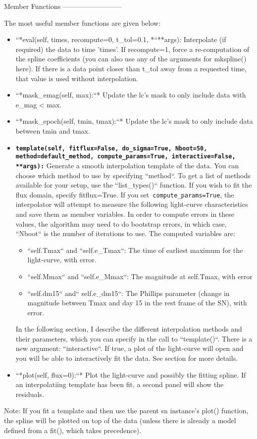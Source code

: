 Member Functions\label{sub:LCMember-Functions}
--------------------------

The most useful member functions are given below:
\begin{itemize}
\item ``*eval(self, times, recompute=0, t_tol=0.1, {*``{**args):}}
Interpolate (if required) the data to time 'times'. If recompute=1,
force a re-computation of the spline coefficients (you can also use
any of the arguments for mkspline() here). If there is a data point
closer than t_tol away from a requested time, that value is used
without interpolation. 
\item ``*mask_emag(self, max):``* Update the lc's mask to only
include data with e_mag < max. 
\item ``*mask_epoch(self, tmin, tmax):``* Update the lc's mask
to only include data between tmin and tmax.
\item \texttt{\textbf{template(self, fitflux=False, do_sigma=True, Nboot=50,
method=default_method, compute_params=True, interactive=False, {*}{*}args):}}
Generate a smooth interpolation template of the data. You can choose
which method to use by specifying ``method``. To get a list of
methods available for your setup, use the ``list_types()`` function.
If you wish to fit the flux domain, specify fitflux=True. If you set\texttt{
compute_params=True}, the interpolator will attempt to measure the
following light-curve characteristics and save them as member variables.
In order to compute errors in these values, the algorithm may need
to do bootstrap errors, in which case, ``Nboot`` is the number
of iterations to use. The computed variables are:

\begin{itemize}
\item ``self.Tmax`` and ``self.e_Tmax``: The time of earliest
maximum for the light-curve, with error.
\item ``self.Mmax`` and ``self.e_Mmax``: The magnitude at self.Tmax,
with error
\item ``self.dm15`` and`` self.e_dm15``: The Phillips parameter
(change in magnitude between Tmax and day 15 in the rest frame of
the SN), with error.
\end{itemize}

In the following section, I describe the different interpolation methods
and their parameters, which you can specify in the call to ``template()``.
There is a new argument: ``interactive``. If true, a plot of
the light-curve will open and you will be able to interactively fit
the data. See section for more details.

\item ``*plot(self, flux=0):``* Plot the light-curve and possibly
the fitting spline. If an interpolatiing template has been fit, a
second panel will show the residuals. 
\end{itemize}
Note: If you fit a template and then use the parent sn instance's
plot() function, the spline will be plotted on top of the data (unless
there is already a model defined from a fit(), which takes precedence).


